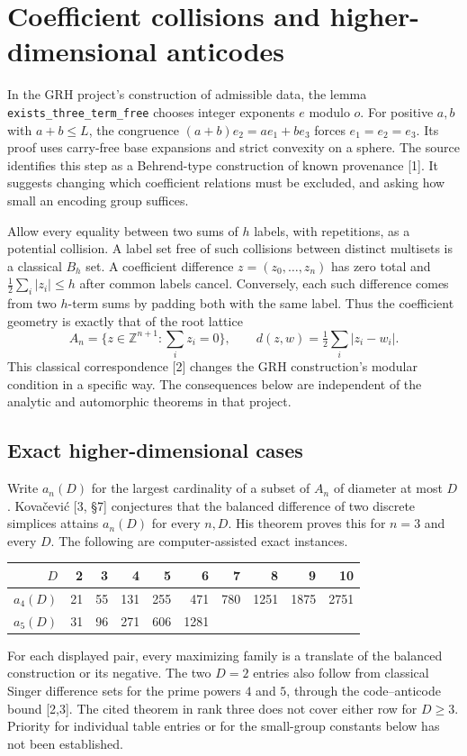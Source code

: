 \section{Coefficient collisions and higher-dimensional anticodes}
\label{sec:lattice}
\newcommand{\Z}{\mathbb Z}\newcommand{\R}{\mathbb R}

In the GRH project's construction of admissible data, the lemma
\texttt{exists\_three\_term\_free} chooses integer exponents $e$ modulo $o$.
For positive $a,b$ with $a+b\le L$, the congruence
$(a+b)e_2=ae_1+be_3$ forces $e_1=e_2=e_3$.
Its proof uses carry-free base expansions and strict convexity on a sphere.
The source identifies this step as a Behrend-type construction of known
provenance [1]. It suggests changing which coefficient relations must be
excluded, and asking how small an encoding group suffices.

Allow every equality between two sums of $h$ labels, with repetitions,
as a potential collision. A label set free of such collisions between distinct
multisets is a classical $B_h$ set. A coefficient difference
$z=(z_0,\ldots,z_n)$ has zero total and
$\tfrac12\sum_i|z_i|\le h$ after common labels cancel. Conversely, each
such difference comes from two $h$-term sums by padding both with the same
label. Thus the coefficient geometry is exactly that of the root lattice
\[
 A_n=\{z\in\Z^{n+1}:\textstyle\sum_i z_i=0\},\qquad
 d(z,w)=\tfrac12\textstyle\sum_i|z_i-w_i|.
\]
This classical correspondence [2] changes the GRH construction's modular
condition in a specific way. The consequences below are independent of the
analytic and automorphic theorems in that project.

\subsection{Exact higher-dimensional cases}
Write $a_n(D)$ for the largest cardinality of a subset of $A_n$ of diameter at
most $D$. Kova\v cevi\'c [3, \S7] conjectures that the balanced difference
of two discrete simplices attains $a_n(D)$ for every $n,D$. His theorem proves
this for $n=3$ and every $D$. The following are computer-assisted exact instances.
\begin{center}
\begin{tabular}{@{}r*{9}{r}@{}}\toprule
$D$ & 2 & 3 & 4 & 5 & 6 & 7 & 8 & 9 & 10\\\midrule
$a_4(D)$ & 21 & 55 & 131 & 255 & 471 & 780 & 1251 & 1875 & 2751\\
$a_5(D)$ & 31 & 96 & 271 & 606 & 1281 & & & &\\\bottomrule
\end{tabular}
\end{center}
For each displayed pair, every maximizing family is a translate of the balanced construction or its negative. The two $D=2$ entries also
follow from classical Singer difference sets for the prime powers $4$ and $5$,
through the code--anticode bound [2,3]. The cited theorem in rank three
does not cover either row for $D\ge3$. Priority for individual table
entries or for the small-group constants below has not been established.

